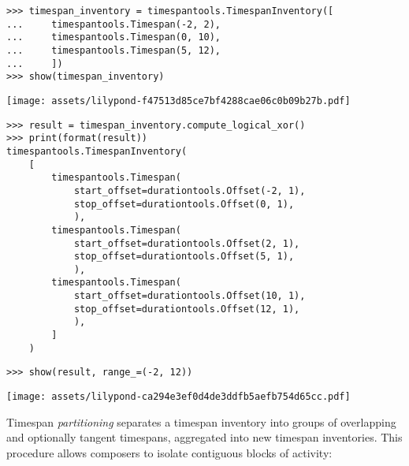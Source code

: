 \begin{abjadbookoutput}
\begin{singlespacing}
\vspace{-0.5\baselineskip}
\begin{lstlisting}
>>> timespan_inventory = timespantools.TimespanInventory([
...     timespantools.Timespan(-2, 2),
...     timespantools.Timespan(0, 10),
...     timespantools.Timespan(5, 12),
...     ])
>>> show(timespan_inventory)
\end{lstlisting}
\noindent\texttt{[image: assets/lilypond-f47513d85ce7bf4288cae06c0b09b27b.pdf]}
\begin{lstlisting}
>>> result = timespan_inventory.compute_logical_xor()
>>> print(format(result))
timespantools.TimespanInventory(
    [
        timespantools.Timespan(
            start_offset=durationtools.Offset(-2, 1),
            stop_offset=durationtools.Offset(0, 1),
            ),
        timespantools.Timespan(
            start_offset=durationtools.Offset(2, 1),
            stop_offset=durationtools.Offset(5, 1),
            ),
        timespantools.Timespan(
            start_offset=durationtools.Offset(10, 1),
            stop_offset=durationtools.Offset(12, 1),
            ),
        ]
    )
\end{lstlisting}
\begin{lstlisting}
>>> show(result, range_=(-2, 12))
\end{lstlisting}
\noindent\texttt{[image: assets/lilypond-ca294e3ef0d4de3ddfb5aefb754d65cc.pdf]}
\end{singlespacing}
\end{abjadbookoutput}

\noindent Timespan \emph{partitioning} separates a timespan inventory into
groups of overlapping and optionally tangent timespans, aggregated into new
timespan inventories. This procedure allows composers to isolate contiguous
blocks of activity:

\begin{comment}
<abjad>
timespan_inventory = timespantools.TimespanInventory([
    timespantools.Timespan(0, 10),
    timespantools.Timespan(5, 15),
    timespantools.Timespan(15, 20),
    timespantools.Timespan(25, 30),
    ])
show(timespan_inventory)
for shard in timespan_inventory.partition():
    show(shard, range_=(0, 30))

for shard in timespan_inventory.partition(include_tangent_timespans=True):
    show(shard, range_=(0, 30))

</abjad>
\end{comment}

